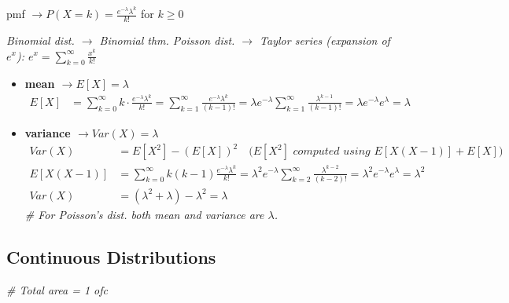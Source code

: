 pmf $\rightarrow P(X=k) = \frac{e^{-\lambda} \lambda^k}{k!}$ for $k \geq 0$

\textit{Binomial dist. $\rightarrow$ Binomial thm. Poisson dist. $\rightarrow$ Taylor series (expansion of $e^x$): $e^x = \sum_{k=0}^\infty \frac{x^k}{k!}$}

\begin{itemize}
    \item \textbf{mean $\rightarrow E[X] = \lambda$}
    \begin{align*}
        E[X] &= \sum_{k=0}^\infty k \cdot \frac{e^{-\lambda} \lambda^k}{k!} 
        = \sum_{k=1}^\infty \frac{e^{-\lambda} \lambda^k}{(k-1)!} 
        = \lambda e^{-\lambda} \sum_{k=1}^\infty \frac{\lambda^{k-1}}{(k-1)!} 
        = \lambda e^{-\lambda} e^{\lambda} = \lambda
    \end{align*}

    \item \textbf{variance $\rightarrow Var(X) = \lambda$}
    \begin{align*}
        Var(X) &= E[X^2] - (E[X])^2 \quad \textit{($E[X^2]$ computed using $E[X(X-1)] + E[X]$)} \\
        E[X(X-1)] &= \sum_{k=0}^\infty k(k-1) \frac{e^{-\lambda} \lambda^k}{k!} 
        = \lambda^2 e^{-\lambda} \sum_{k=2}^\infty \frac{\lambda^{k-2}}{(k-2)!} 
        = \lambda^2 e^{-\lambda} e^{\lambda} = \lambda^2 \\
        Var(X) &= (\lambda^2 + \lambda) - \lambda^2 = \lambda
    \end{align*}
    \textit{\# For Poisson's dist. both mean and variance are $\lambda$.}
\end{itemize}

\newpage
\subsection{Continuous Distributions}
\textit{\# Total area = 1 ofc}


